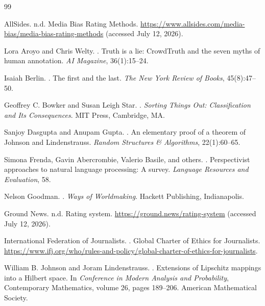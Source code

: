 \documentclass[12pt]{article}
\begin{document}
\newpage
\begin{thebibliography}{99}

AllSides.
\newblock n.d.
\newblock Media Bias Rating Methods.
\newblock \url{https://www.allsides.com/media-bias/media-bias-rating-methods} (accessed July 12, 2026).

Lora Aroyo and Chris Welty.
.
\newblock Truth is a lie: CrowdTruth and the seven myths of human annotation.
\newblock \emph{AI Magazine}, 36(1):15--24.

Isaiah Berlin.
.
\newblock The first and the last.
\newblock \emph{The New York Review of Books}, 45(8):47--50.

Geoffrey C. Bowker and Susan Leigh Star.
.
\newblock \emph{Sorting Things Out: Classification and Its Consequences}.
\newblock MIT Press, Cambridge, MA.

Sanjoy Dasgupta and Anupam Gupta.
.
\newblock An elementary proof of a theorem of Johnson and Lindenstrauss.
\newblock \emph{Random Structures \& Algorithms}, 22(1):60--65.

Simona Frenda, Gavin Abercrombie, Valerio Basile, and others.
.
\newblock Perspectivist approaches to natural language processing: A survey.
\newblock \emph{Language Resources and Evaluation}, 58.

Nelson Goodman.
.
\newblock \emph{Ways of Worldmaking}.
\newblock Hackett Publishing, Indianapolis.

Ground News.
\newblock n.d.
\newblock Rating system.
\newblock \url{https://ground.news/rating-system} (accessed July 12, 2026).

International Federation of Journalists.
.
\newblock Global Charter of Ethics for Journalists.
\newblock \url{https://www.ifj.org/who/rules-and-policy/global-charter-of-ethics-for-journalists}.

William B. Johnson and Joram Lindenstrauss.
.
\newblock Extensions of Lipschitz mappings into a Hilbert space.
\newblock In \emph{Conference in Modern Analysis and Probability}, Contemporary Mathematics, volume 26, pages 189--206. American Mathematical Society.


\end{thebibliography}
\end{document}
